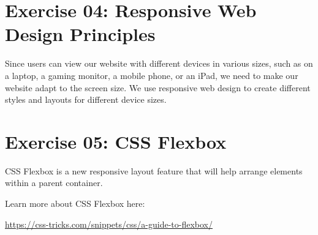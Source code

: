 \documentclass{42-en}
\begin{document}
\chapter{Exercise 04: Responsive Web Design Principles}

\exnumber{\exercicenumber}

\makeheaderfiles

Since users can view our website with different devices in various sizes, such as on a laptop, a gaming monitor, a mobile phone, or an iPad, we need to make our website adapt to the screen size. We use responsive web design to create different styles and layouts for different device sizes.


\chapter{Exercise 05: CSS Flexbox}

\exnumber{\exercicenumber}

\makeheaderfiles

CSS Flexbox is a new responsive layout feature that will help arrange elements within a parent container.\par
\vspace{.2in}
Learn more about CSS Flexbox here: \par
\url{https://css-tricks.com/snippets/css/a-guide-to-flexbox/}

\end{document}
